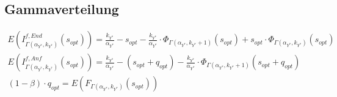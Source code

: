 \subsection{Gammaverteilung}
\begin{gather*}
E\left(I^{f,End}_{\Gamma\left(\alpha_{Y^*},k_{Y^*}\right)}\left(s_{opt}\right)\right)=\frac{k_{Y^*}}{\alpha_{Y^*}}-s_{opt}-\frac{k_{Y^*}}{\alpha_{Y^*}}\cdot \Phi_{\Gamma\left(\alpha_{Y^*},k_{Y^*}+1\right)}\left(s_{opt}\right)+s_{opt}\cdot \Phi_{\Gamma\left(\alpha_{Y^*},k_{Y^*}\right)}\left(s_{opt}\right) \\
E\left(I^{f,Anf}_{\Gamma\left(\alpha_{Y^*},k_{Y^*}\right)}\left(s_{opt}\right)\right)=\frac{k_{Y^*}}{\alpha_{Y^*}}-\left(s_{opt}+q_{opt}\right)-\frac{k_{Y^*}}{\alpha_{Y^*}}\cdot \Phi_{\Gamma\left(\alpha_{Y^*},k_{Y^*}+1\right)}\left(s_{opt}+q_{opt}\right) \\
\left(1-\beta\right)\cdot q_{opt}= E\left(F_{\Gamma\left(\alpha_{Y^*},k_{Y^*}\right)}\left(s_{opt}\right)\right)
\end{gather*}